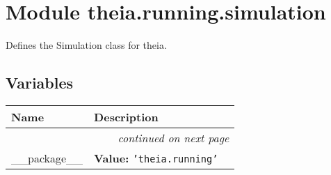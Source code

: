 %
%
%


\section{Module theia.running.simulation}

    \label{theia:running:simulation}
Defines the Simulation class for theia.



  \subsection{Variables}

    \vspace{-1cm}
\hspace{\varindent}\begin{longtable}{|p{\varnamewidth}|p{\vardescrwidth}|l}
\cline{1-2}
\cline{1-2} \centering \textbf{Name} & \centering \textbf{Description}& \\
\cline{1-2}
\endhead\cline{1-2}\multicolumn{3}{r}{\small\textit{continued on next page}}\\\endfoot\cline{1-2}
\endlastfoot\raggedright \_\-\_\-p\-a\-c\-k\-a\-g\-e\-\_\-\_\- & \raggedright \textbf{Value:} 
{\tt \texttt{'}\texttt{theia.running}\texttt{'}}&\\
\cline{1-2}
\end{longtable}




